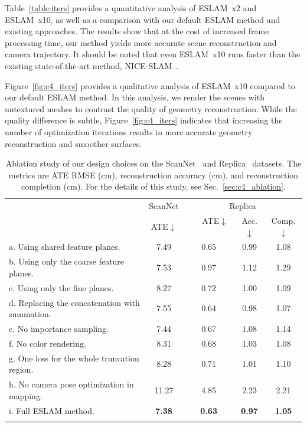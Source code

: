 Table~\ref{table:iters} provides a quantitative analysis of ESLAM~x2 and ESLAM~x10, as well as a comparison with our default ESLAM method and existing approaches. The results show that at the cost of increased frame processing time, our method yields more accurate scene reconstruction and camera trajectory. It should be noted that even ESLAM~x10 runs faster than the existing state-of-the-art method, NICE-SLAM~\cite{zhu2022nice}.

Figure~\ref{fig:c4_iters} provides a qualitative analysis of ESLAM~x10 compared to our default ESLAM method. In this analysis, we render the scenes with untextured meshes to contrast the quality of geometry reconstruction. While the quality difference is subtle, Figure~\ref{fig:c4_iters} indicates that increasing the number of optimization iterations results in more accurate geometry reconstruction and smoother surfaces.

\begin{table}[t]
    \begin{center}
        \begin{tabular}{l|c|ccc}
            \Xhline{2\arrayrulewidth}
            \multirow{2}{*}{Experiment} & \multicolumn{1}{c|}{ScanNet} &  \multicolumn{3}{c}{Replica}  \\
            
            & ATE$\downarrow$ & ~~~ATE$\downarrow$~~~ & Acc.$\downarrow$ & Comp.$\downarrow$ \\
    
            \hline
            a. Using shared feature planes. & \phantom{0}7.49 & 0.65 & 0.99 & 1.08 \\
            b. Using only the coarse feature planes. & \phantom{0}7.53 & 0.97 & 1.12 & 1.29 \\
            c. Using only the fine planes. & \phantom{0}8.27 & 0.72 & 1.00 & 1.09 \\
            d. Replacing the concatenation with summation. & \phantom{0}7.55 & 0.64 & 0.98 & 1.07 \\
            e. No importance sampling. & \phantom{0}7.44 & 0.67 & 1.08 & 1.14 \\
            f. No color rendering. & \phantom{0}8.31 & 0.68 & 1.03 & 1.08 \\
            g. One loss for the whole truncation region. & \phantom{0}8.28 & 0.71 & 1.01 & 1.10 \\
            h. No camera pose optimization in mapping. & 11.27 & 4.85 & 2.23 & 2.21 \\
            i. Full ESLAM method. & \phantom{0}\textbf{7.38} & \textbf{0.63} & \textbf{0.97} & \textbf{1.05} \\
    
            \Xhline{2\arrayrulewidth}
        \end{tabular}
    \end{center}
    \caption{Ablation study of our design choices on the ScanNet~\cite{dai2017scannet} and Replica~\cite{replica19arxiv} datasets. The metrics are ATE RMSE (cm), reconstruction accuracy (cm), and reconstruction completion (cm). For the details of this study, see Sec.~\ref{sec:c4_ablation}.}
    \label{table:ab_choices}
\end{table}

